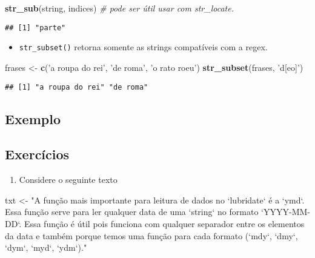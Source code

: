 \documentclass[]{book}
\newenvironment{Shaded}{\begin{snugshade}}{\end{snugshade}}
\newcommand{\KeywordTok}[1]{\textcolor[rgb]{0.13,0.29,0.53}{\textbf{{#1}}}}
\newcommand{\StringTok}[1]{\textcolor[rgb]{0.31,0.60,0.02}{{#1}}}
\newcommand{\CommentTok}[1]{\textcolor[rgb]{0.56,0.35,0.01}{\textit{{#1}}}}
\newcommand{\NormalTok}[1]{{#1}}
\providecommand{\tightlist}{%
  \setlength{\itemsep}{0pt}\setlength{\parskip}{0pt}}
\begin{document}
\begin{Shaded}
\begin{Highlighting}[]
\KeywordTok{str_sub}\NormalTok{(string, indices) }\CommentTok{# pode ser útil usar com str_locate.}
\end{Highlighting}
\end{Shaded}

\begin{verbatim}
## [1] "parte"
\end{verbatim}

\begin{itemize}
\tightlist
\item
  \texttt{str\_subset()} retorna somente as strings compatíveis com a
  regex.
\end{itemize}

\begin{Shaded}
\begin{Highlighting}[]
\NormalTok{frases <-}\StringTok{ }\KeywordTok{c}\NormalTok{(}\StringTok{'a roupa do rei'}\NormalTok{, }\StringTok{'de roma'}\NormalTok{, }\StringTok{'o rato roeu'}\NormalTok{)}
\KeywordTok{str_subset}\NormalTok{(frases, }\StringTok{'d[eo]'}\NormalTok{)}
\end{Highlighting}
\end{Shaded}

\begin{verbatim}
## [1] "a roupa do rei" "de roma"
\end{verbatim}

\subsection{Exemplo}\label{exemplo}

\subsection{Exercícios}\label{exercicios}

\begin{enumerate}
\def\labelenumi{\arabic{enumi}.}
\tightlist
\item
  Considere o seguinte texto
\end{enumerate}

\begin{Shaded}
\begin{Highlighting}[]
\NormalTok{txt <-}\StringTok{ "A função mais importante para leitura de dados no `lubridate` é a `ymd`. Essa função serve para ler qualquer data de uma `string` no formato `YYYY-MM-DD`. Essa função é útil pois funciona com qualquer separador entre os elementos da data e também porque temos uma função para cada formato (`mdy`, `dmy`, `dym`, `myd`, `ydm`)."}
\end{Highlighting}
\end{Shaded}
\end{document}
